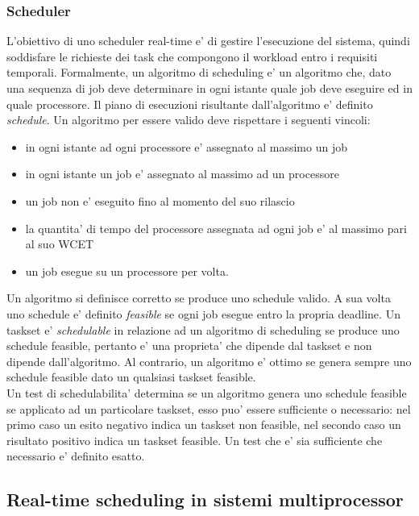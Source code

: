 \subsubsection{Scheduler}
\label{sec:overviewSCHED}

L'obiettivo di uno scheduler real-time e' di gestire l'esecuzione del sistema, quindi soddisfare le richieste dei task che compongono il workload entro i requisiti temporali. Formalmente, un algoritmo di scheduling e' un algoritmo che, dato una sequenza di job deve determinare in ogni istante quale job deve eseguire ed in quale processore. Il piano di esecuzioni risultante dall'algoritmo e' definito \textit{schedule}. Un algoritmo per essere valido deve rispettare i seguenti vincoli:\\

\begin{itemize}
	\item in ogni istante ad ogni processore e' assegnato al massimo un job 
	\item in ogni istante un job e' assegnato al massimo ad un processore
	\item un job non e' eseguito fino al momento del suo rilascio
	\item la quantita' di tempo del processore assegnata ad ogni job e' al massimo pari al suo WCET
	\item un job esegue su un processore per volta.
\end{itemize}

Un algoritmo si definisce corretto se produce uno schedule valido. A sua volta uno schedule e' definito \textit{feasible} se ogni job esegue entro la propria deadline. Un taskset e' \textit{schedulable} in relazione ad un algoritmo di scheduling se produce uno schedule feasible, pertanto e' una proprieta' che dipende dal taskset e non dipende dall'algoritmo. Al contrario, un algoritmo e' ottimo se genera sempre uno schedule feasible dato un qualsiasi taskset feasible.\\

Un test di schedulabilita' determina se un algoritmo genera uno schedule feasible se applicato ad un particolare taskset, esso puo' essere sufficiente o necessario: nel primo caso un esito negativo indica un taskset non feasible, nel secondo caso un risultato positivo indica un taskset feasible. Un test che e' sia sufficiente che necessario e' definito esatto.\\

\subsection{Real-time scheduling in sistemi multiprocessor}
\label{sec:SchedMulti}

